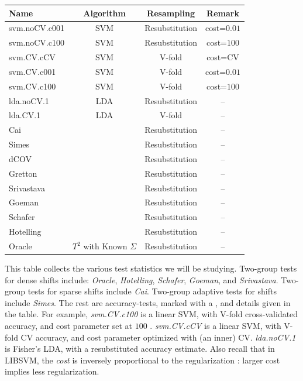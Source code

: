 \documentclass[oupdraft]{bio}
\begin{document}
\begin{tcolorbox}
	\centering
	\footnotesize
	\begin{tabular}{l|c|c|c}
		Name & Algorithm & Resampling & Remark\\ 
		\hline
		\hline
		\cue svm.noCV.c001 	& SVM & Resubstitution  & cost=$0.01$ \\ 
		\cue svm.noCV.c100 	& SVM & Resubstitution  & cost=$100$ \\ 
		\cue svm.CV.cCV 	& SVM & V-fold  & cost=CV \\ 
		\cue svm.CV.c001	& SVM & V-fold 		    & cost=$0.01$ \\ 
		\cue svm.CV.c100	& SVM & V-fold 		    & cost=$100$ \\ 
		\cue lda.noCV.1 	& LDA & Resubstitution 	&  --\\ 
		\cue lda.CV.1 	& LDA & V-fold 			&  -- \\ 
		Cai & \cite{cai_two-sample_2013} & Resubstitution & -- \\ 
		Simes & \cite{simes1986improved} & Resubstitution & -- \\ 
		dCOV & \cite{szekely2004testing} & Resubstitution & -- \\ 
		Gretton & \cite{gretton_kernel_2012-1} & Resubstitution & -- \\ 
		Srivastava & \cite{srivastava_test_2008} & Resubstitution & -- \\ 
		Goeman & \cite{goeman2006testing} & Resubstitution & -- \\ 
		Schafer & \cite{schafer_shrinkage_2005} & Resubstitution & -- \\ 
		Hotelling & \cite{hotelling_generalization_1931} & Resubstitution & -- \\
		Oracle & $T^2$ with Known $\Sigma$ & Resubstitution & -- \\ 
	\end{tabular} 
	\captionsetup{type=table}
	\caption{\footnotesize
		This table collects the various test statistics we will be studying. 
		Two-group tests for dense shifts include: \textit{Oracle}, \textit{Hotelling}, \textit{Schafer}, \textit{Goeman}, and \textit{Srivastava}.
		Two-group tests for sparse shifts include \textit{Cai}.
		Two-group adaptive tests for shifts include \textit{Simes}.
		The rest are accuracy-tests, marked with a \cue, and details given in the table. 	
		For example, \textit{svm.CV.c100} is a linear SVM, with V-fold cross-validated accuracy, and cost parameter set at $100$ \citep{meyer_e1071:_2015}.
		\textit{svm.CV.cCV} is a linear SVM, with V-fold CV accuracy, and cost parameter optimized with (an inner) CV. 
		\textit{lda.noCV.1} is Fisher's LDA, with a resubstituted accuracy estimate.
		Also recall that in LIBSVM, the \emph{cost} is inversely proportional to the regularization \citep{chang2011libsvm}: larger cost implies less regularization. 
	}
	\label{tab:collected}
\end{tcolorbox}
\end{document}
